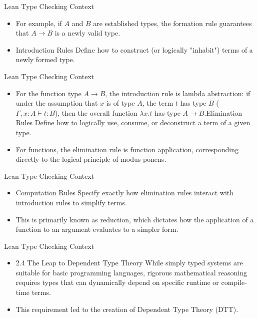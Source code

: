 \documentclass[10pt]{beamer}
\begin{document}
\begin{frame}{Lean Type Checking Context}
\begin{itemize}\setlength{\itemsep}{1.5em}
  \item For example, if $A$ and $B$ are established types, the formation rule guarantees that $A \to B$ is a newly valid type.
  \item Introduction Rules Define how to construct (or logically "inhabit") terms of a newly formed type.
\end{itemize}
\end{frame}

\begin{frame}{Lean Type Checking Context}
\begin{itemize}\setlength{\itemsep}{1.5em}
  \item For the function type $A \to B$, the introduction rule is lambda abstraction: if under the assumption that $x$ is of type $A$, the term $t$ has type $B$ ($\Gamma, x:A \vdash t:B$), then the overall function $\lambda x. t$ has type $A \to B$.Elimination Rules Define how to logically use, consume, or deconstruct a term of a given type.
  \item For functions, the elimination rule is function application, corresponding directly to the logical principle of modus ponens.
\end{itemize}
\end{frame}

\begin{frame}{Lean Type Checking Context}
\begin{itemize}\setlength{\itemsep}{1.5em}
  \item Computation Rules Specify exactly how elimination rules interact with introduction rules to simplify terms.
  \item This is primarily known as reduction, which dictates how the application of a function to an argument evaluates to a simpler form.
\end{itemize}
\end{frame}

\begin{frame}{Lean Type Checking Context}
\begin{itemize}\setlength{\itemsep}{1.5em}
  \item 2.4 The Leap to Dependent Type Theory While simply typed systems are suitable for basic programming languages, rigorous mathematical reasoning requires types that can dynamically depend on specific runtime or compile-time terms.
  \item This requirement led to the creation of Dependent Type Theory (DTT).
\end{itemize}
\end{frame}
\end{document}
